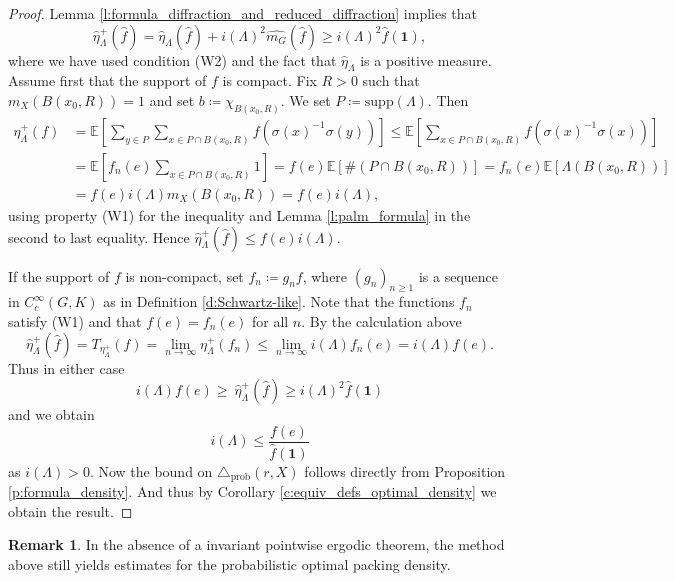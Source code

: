 \documentclass[12pt,reqno,a4paper]{amsart}
\theoremstyle{theorem}
\theoremstyle{definition}
\newtheorem{remark}[theorem]{Remark}
\numberwithin{theorem}{section}
\numberwithin{equation}{section}
\newcommand{\supp}{\mathrm{supp}}
\begin{document}
\begin{proof}
	Lemma \ref{l:formula_diffraction_and_reduced_diffraction} implies that 
	\[
	\widehat{\eta}_\Lambda^+(\widehat{f}) = \widehat{\eta}_\Lambda(\widehat{f}) + i(\Lambda)^2\widehat{m_G}(\widehat{f}) \geq i(\Lambda)^2\widehat{f}(\mathbf{1}),
	\]
	where we have used condition (W2) and the fact that $\widehat{\eta}_\Lambda$ is a positive measure.
	Assume first that the support of $f$ is compact.
	Fix $R>0$ such that $m_X(B(x_0,R)) = 1$ and set $b\coloneqq\chi_{B(x_0,R)}$. We set $P\coloneqq \supp(\Lambda)$.
	Then
	\begin{align*}
		\eta_\Lambda^+(f) &= \mathbb{E}\left[\sum_{y\in P}\sum_{x\in P\cap B(x_0,R)}f(\sigma(x)^{-1}\sigma(y))\right]
		\leq \mathbb{E}\left[\sum_{x\in P\cap B(x_0,R)}f(\sigma(x)^{-1}\sigma(x))\right]\\
		&= \mathbb{E}\left[f_n(e)\sum_{x\in P\cap B(x_0,R)}1\right] = f(e)\mathbb{E}\left[\#(P\cap B(x_0,R))\right] = f_n(e)\mathbb{E}\left[\Lambda(B(x_0,R))\right]\\ 
		&= f(e)i(\Lambda) m_{X}(B(x_0,R)) = f(e)i(\Lambda),
	\end{align*}
	using property (W1) for the inequality and Lemma \ref{l:palm_formula} in the second to last equality.
	Hence $\widehat{\eta}_\Lambda^+(\widehat{f})\leq f(e)i(\Lambda)$.
	
	If the support of $f$ is non-compact, set $f_n\coloneqq g_nf$, where $(g_n)_{n\geq 1}$ is a sequence in $C_c^\infty(G, K)$ as in  Definition \ref{d:Schwartz-like}.
	Note that the functions $f_n$ satisfy (W1) and that $f(e) = f_n(e)$ for all $n$.
	By the calculation above 
	\[\widehat{\eta}_\Lambda^+(\widehat{f}) = T_{\eta_\Lambda^+}(f) = \lim_{n\to \infty} \eta_\Lambda^+(f_n)\leq \lim_{n\to \infty} i(\Lambda)f_n(e) = i(\Lambda)f(e).\]
	Thus in either case
	 \[i(\Lambda)f(e)\geq\ \widehat{\eta}_\Lambda^+(\widehat{f})\geq i(\Lambda)^2\widehat{f}(\mathbf{1})\] 
	and we obtain
	\[
	i(\Lambda) \leq \frac{f(e)}{\widehat{f}(\mathbf{1})}
	\]
	as $i(\Lambda)>0$.
	Now the bound on $\triangle_{\mathrm{prob}}(r,X)$ follows directly from Proposition \ref{p:formula_density}. And thus by Corollary \ref{c:equiv_defs_optimal_density} we obtain the result.
\end{proof}

\begin{remark}
	In the absence of a invariant pointwise ergodic theorem, the method above still yields estimates for the probabilistic optimal packing density.
\end{remark}
\end{document}

